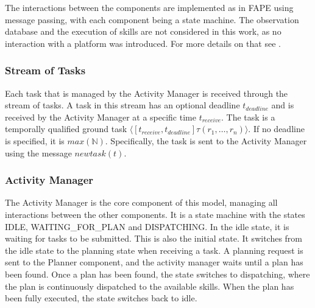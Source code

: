 
The interactions between the components are implemented as in FAPE using message passing, with each component being a state machine.
The observation database and the execution of skills are not considered in this work, as no interaction with a platform was introduced.
For more details on that see \cite{bit-monnotTemporalHierarchicalModels2016a}.

\subsubsection{Stream of Tasks}

Each task that is managed by the Activity Manager is received through the stream of tasks.
A task in this stream has an optional deadline $t_{deadline}$ and is received by the Activity Manager at a specific time $t_{receive}$.
The task is a temporally qualified ground task $\langle[t_{receive},t_{deadline}] \tau(r_1,\dots,r_n)\rangle$.
If no deadline is specified, it is $max(\mathbb{N})$.
Specifically, the task is sent to the Activity Manager using the message $newtask(t)$.

\subsubsection{Activity Manager}

The Activity Manager is the core component of this model, managing all interactions between the other components.
It is a state machine with the states IDLE, WAITING\_FOR\_PLAN and DISPATCHING.
In the idle state, it is waiting for tasks to be submitted.
This is also the initial state.
It switches from the idle state to the planning state when receiving a task.
A planning request is sent to the Planner component, and the activity manager waits until a plan has been found.
Once a plan has been found, the state switches to dispatching, where the plan is continuously dispatched to the available skills.
When the plan has been fully executed, the state switches back to idle.

